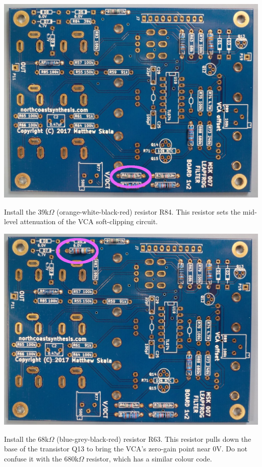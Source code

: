 \nopagebreak
\noindent\includegraphics[width=\linewidth]{res-27k1.jpg}

\pagebreak

Install the 39k$\Omega$ (orange-white-black-red) resistor R84.
This resistor sets the mid-level attenuation of the VCA soft-clipping
circuit.

\nopagebreak
\noindent\includegraphics[width=\linewidth]{res-39k1.jpg}

Install the 68k$\Omega$ (blue-grey-black-red) resistor R63.
This resistor pulls down the base of the transistor Q13 to bring the VCA's
zero-gain point near 0V.  Do not confuse it with the 680k$\Omega$ resistor,
which has a similar colour code.

